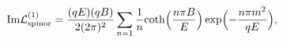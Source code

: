 \begin{equation}
{\rm Im} {\cal L}^{(1)}_{\rm spinor} = \frac{(qE)(qB)}{ 2 (2 \pi)^2} 
\sum_{n = 1} \frac{1}{n} {\rm coth} \Bigl(\frac{n \pi B}{E} \Bigr) 
\exp\Bigl(- \frac{n \pi m^2}{qE} \Bigr), \label{form2}
\end{equation} 
